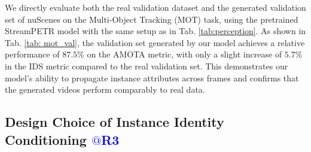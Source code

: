We directly evaluate both the real validation dataset and the generated validation set of nuScenes on the Multi-Object Tracking (MOT) task, using the pretrained StreamPETR model with the same setup as in Tab. \ref{tab:perception}.  
As shown in Tab. \ref{tab: mot_val}, the validation set generated by our model achieves a relative performance of $87.5\%$ on the AMOTA metric, with only a slight increase of $5.7\%$ in the IDS metric compared to the real validation set. This demonstrates our model’s ability to propagate instance attributes across frames and confirms that the generated videos perform comparably to real data.


\begin{table}[t]
    \centering
    \footnotesize
    \caption{Comparison of MOT task performance on real or generated nuScenes (T+I)2V validation data. Evaluated with pre-trained StreamPETR, our model outperforms DriveDreamer2, showing its ability to faithfully propagate instance attributes over frames.
    }
    \label{tab: mot_val}
\end{table}













\subsection{Design Choice of Instance Identity Conditioning \textcolor{blue}{$@$R3}}

